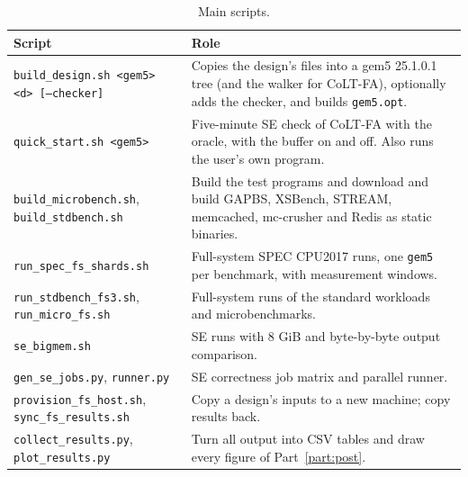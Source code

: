 \begin{table}[H]
\centering
\small
\caption{Main scripts.}
\label{tab:art_scripts}
\begin{tabularx}{\textwidth}{l X}
\toprule
\textbf{Script} & \textbf{Role} \\
\midrule
\texttt{build\_design.sh <gem5> <d> [--checker]} & Copies the design's files into a gem5 25.1.0.1 tree (and the walker for CoLT-FA), optionally adds the checker, and builds \texttt{gem5.opt}. \\
\texttt{quick\_start.sh <gem5>} & Five-minute SE check of CoLT-FA with the oracle, with the buffer on and off. Also runs the user's own program. \\
\texttt{build\_microbench.sh}, \texttt{build\_stdbench.sh} & Build the test programs and download and build GAPBS, XSBench, STREAM, memcached, mc-crusher and Redis as static binaries. \\
\texttt{run\_spec\_fs\_shards.sh} & Full-system SPEC CPU2017 runs, one \texttt{gem5} per benchmark, with measurement windows. \\
\texttt{run\_stdbench\_fs3.sh}, \texttt{run\_micro\_fs.sh} & Full-system runs of the standard workloads and microbenchmarks. \\
\texttt{se\_bigmem.sh} & SE runs with 8 GiB and byte-by-byte output comparison. \\
\texttt{gen\_se\_jobs.py}, \texttt{runner.py} & SE correctness job matrix and parallel runner. \\
\texttt{provision\_fs\_host.sh}, \texttt{sync\_fs\_results.sh} & Copy a design's inputs to a new machine; copy results back. \\
\texttt{collect\_results.py}, \texttt{plot\_results.py} & Turn all output into CSV tables and draw every figure of Part~\ref{part:post}. \\
\bottomrule
\end{tabularx}
\end{table}

